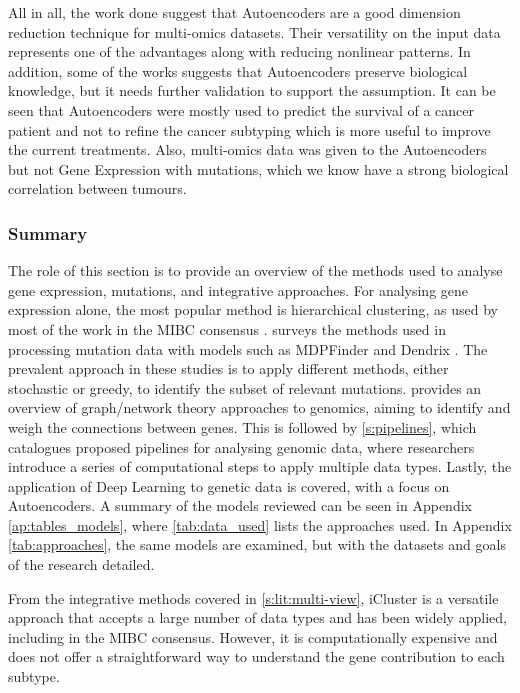 All in all, the work done suggest that Autoencoders are a good dimension reduction technique for multi-omics datasets. Their versatility on the input data represents one of the advantages along with reducing nonlinear patterns. In addition, some of the works suggests that Autoencoders preserve biological knowledge, but it needs further validation to support the assumption. It can be seen that Autoencoders were mostly used to predict the survival of a cancer patient and not to refine the cancer subtyping which is more useful to improve the current treatments. Also, multi-omics data was given to the Autoencoders but not Gene Expression with mutations, which we know have a strong biological correlation between tumours.

\subsubsection{Summary}

The role of this section is to provide an overview of the methods used to analyse gene expression, mutations, and integrative approaches. For analysing gene expression alone, the most popular method is hierarchical clustering, as used by most of the work in the MIBC consensus \cite{Kamoun2020-tj}.  surveys the methods used in processing mutation data with models such as MDPFinder \cite{Zhao2012-wj} and Dendrix \cite{Vandin2012-cf}. The prevalent approach in these studies is to apply different methods, either stochastic or greedy, to identify the subset of relevant mutations.  provides an overview of graph/network theory approaches to genomics, aiming to identify and weigh the connections between genes. This is followed by \cref{s:pipelines}, which catalogues proposed pipelines for analysing genomic data, where researchers introduce a series of computational steps to apply multiple data types. Lastly, the application of Deep Learning to genetic data is covered, with a focus on Autoencoders. A summary of the models reviewed can be seen in Appendix \cref{ap:tables_models}, where \cref{tab:data_used} lists the approaches used. In Appendix \cref{tab:approaches}, the same models are examined, but with the datasets and goals of the research detailed.

From the integrative methods covered in \cref{s:lit:multi-view}, iCluster \cite{Shen2012-yj} is a versatile approach that accepts a large number of data types and has been widely applied, including in the MIBC consensus. However, it is computationally expensive and does not offer a straightforward way to understand the gene contribution to each subtype.

